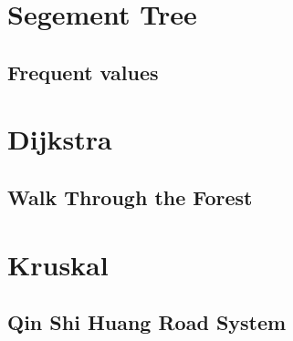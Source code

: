 \section{Segement Tree}
        \subsection{Frequent values}
                

\section{Dijkstra}
%                 
        \subsection{Walk Through the Forest}
                

\section{Kruskal}
        \subsection{Qin Shi Huang Road System}
                

%                 
%                 
%                 
